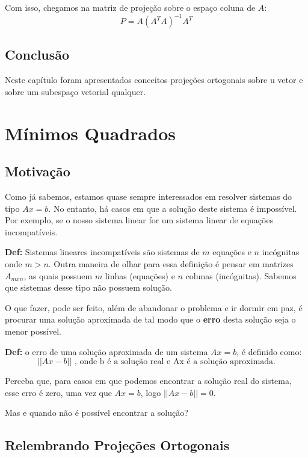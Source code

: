 \documentclass[12pt]{article}
\begin{document}
	Com isso, chegamos na matriz de projeção sobre o espaço coluna de $A$:
	\begin{equation*}
		P=A\left(A^TA\right)^{-1}A^T
	\end{equation*}
	\subsection{Conclusão}
	Neste capítulo foram apresentados conceitos projeções ortogonais sobre u vetor e sobre um subespaço vetorial qualquer.
	
	\section{Mínimos Quadrados}
	
	\subsection{Motivação}
	
	Como já sabemos, estamos quase sempre interessados em resolver sistemas do tipo $Ax=b$. No entanto, há casos em que a solução deste sistema é impossível. Por exemplo, se o nosso sistema linear for um sistema linear de equações incompatíveis.
	
	\textbf{Def:} Sistemas lineares incompatíveis são sistemas de $m$ equações e $n$ incógnitas onde $m>n$. Outra maneira de olhar para essa definição é pensar em matrizes $A_{mxn}$, as quais possuem $m$ linhas (equações) e $n$ colunas (incógnitas). Sabemos que sistemas desse tipo não possuem solução.
	
	O que fazer, pode ser feito, além de abandonar o problema e ir dormir em paz, é procurar uma solução aproximada de tal modo que o \textbf{erro} desta solução seja o menor possível. 
	
	\textbf{Def:} o erro de uma solução aproximada de um sistema $Ax=b$, é definido como:
	\begin{equation*}
		||Ax-b|| \mbox{ , onde b é a solução real e Ax é a solução aproximada.}
	\end{equation*}
	
	Perceba que, para casos em que podemos encontrar a solução real do sistema, esse erro é zero, uma vez que $Ax=b$, logo $||Ax-b||=0$.
	
	Mas e quando não é possível encontrar a solução?
	
	\subsection{Relembrando Projeções Ortogonais}
	
\end{document}
